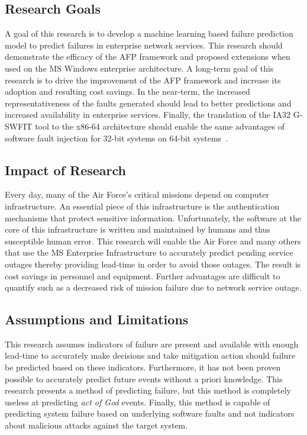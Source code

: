 \subsection{Research Goals} 
A goal of this research is to develop a machine learning based failure
prediction model to predict failures in enterprise network services.  This
research should demonstrate the efficacy of the \ac{AFP} framework and proposed
extensions when used on the \ac{MS} Windows enterprise architecture.  A
long-term goal of this research is to drive the improvement of the \ac{AFP}
framework and increase its adoption and resulting cost savings.  In the
near-term, the increased representativeness of the faults generated should lead
to better predictions and increased availability in enterprise services.
Finally, the translation of the IA32 \ac{G-SWFIT} tool to the x86-64
architecture should enable the same advantages of software fault injection for
32-bit systems on 64-bit systems~\cite{gswfit}.

\subsection{Impact of Research}
Every day, many of the Air Force's critical missions depend on computer
infrastructure.  An essential piece of this infrastructure is the
authentication mechanisms that protect  sensitive information.  Unfortunately,
the software at the core of this infrastructure is written and maintained by
humans and thus susceptible human error.  This research will enable the Air
Force and many others that use the \ac{MS} Enterprise Infrastructure to
accurately predict pending service outages thereby providing lead-time in order
to avoid those outages.  The result is cost savings in personnel and equipment.
Further advantages are difficult to quantify such as a decreased risk of
mission failure due to network service outage.

\subsection{Assumptions and Limitations}
This research assumes indicators of failure are present and available with
enough lead-time to accurately make decisions and take mitigation action should
failure be predicted based on these indicators.  Furthermore, it has not been
proven possible to accurately predict future events without a priori knowledge.
This research presents a method of predicting failure, but this method is
completely useless at predicting \emph{act of God} events.  Finally, this
method is capable of predicting system failure based on underlying software
faults and not indicators about malicious attacks against the target system.

